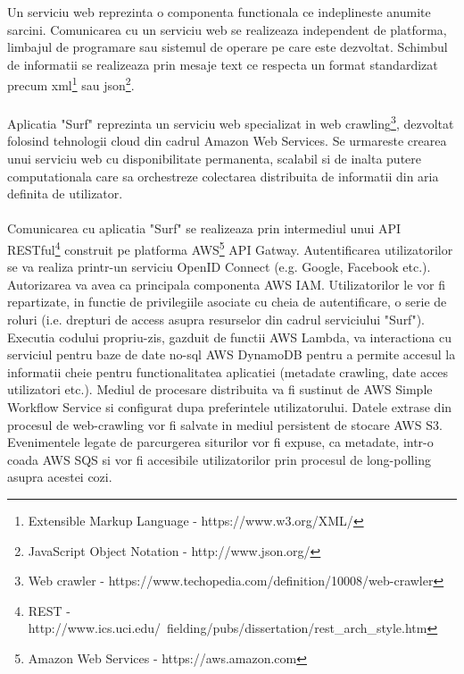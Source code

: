 \newcommand{\xmlDescription}{Extensible Markup Language - https://www.w3.org/XML/}
\newcommand{\jsonDescription}{JavaScript Object Notation - http://www.json.org/}
\newcommand{\crawlDescription}{Web crawler - https://www.techopedia.com/definition/10008/web-crawler}
\newcommand{\restDescription}{REST - http://www.ics.uci.edu/~fielding/pubs/dissertation/rest\_arch\_style.htm}
\newcommand{\awsDescription}{Amazon Web Services - https://aws.amazon.com}

Un serviciu web reprezinta o componenta functionala ce indeplineste anumite sarcini. Comunicarea cu un serviciu web se realizeaza independent de platforma, limbajul de programare sau sistemul de operare pe care este dezvoltat. Schimbul de informatii se realizeaza prin mesaje text ce respecta un format standardizat precum xml\footnote{\xmlDescription} sau json\footnote{\jsonDescription}. 
\\
\\
Aplicatia "Surf" reprezinta un serviciu web specializat in web crawling\footnote{\crawlDescription}, dezvoltat folosind tehnologii cloud din cadrul Amazon Web Services. Se urmareste crearea unui serviciu web cu disponibilitate permanenta, scalabil si de inalta putere computationala care sa orchestreze colectarea distribuita de informatii din aria definita de utilizator.
\\
\\
Comunicarea cu aplicatia "Surf" se realizeaza prin intermediul unui API RESTful\footnote{\restDescription} construit pe platforma AWS\footnote{\awsDescription} API Gatway. Autentificarea utilizatorilor se va realiza printr-un serviciu OpenID Connect (e.g. Google, Facebook etc.). Autorizarea va avea ca principala componenta AWS IAM. Utilizatorilor le vor fi repartizate, in functie de privilegiile asociate cu cheia de autentificare, o serie de roluri (i.e. drepturi de access asupra resurselor din cadrul serviciului "Surf"). Executia codului propriu-zis, gazduit de functii AWS Lambda, va interactiona cu serviciul pentru baze de date no-sql AWS DynamoDB pentru a permite accesul la informatii cheie pentru functionalitatea aplicatiei (metadate crawling, date acces utilizatori etc.). Mediul de procesare distribuita va fi sustinut de AWS Simple Workflow Service si configurat dupa preferintele utilizatorului. Datele extrase din procesul de web-crawling vor fi salvate in mediul persistent de stocare AWS S3. Evenimentele legate de parcurgerea siturilor vor fi expuse, ca metadate, intr-o coada AWS SQS si vor fi accesibile utilizatorilor prin procesul de long-polling asupra acestei cozi.

